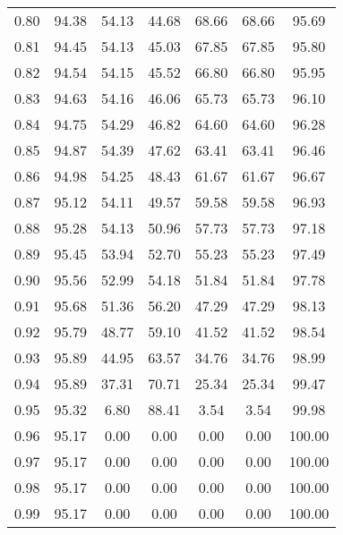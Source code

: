\begin{tabular}{|c|c|c|c|c|c|c|}
      0.80 &     94.38 &     54.13 &      44.68 &   68.66 &      68.66 &         95.69 \\
      0.81 &     94.45 &     54.13 &      45.03 &   67.85 &      67.85 &         95.80 \\
      0.82 &     94.54 &     54.15 &      45.52 &   66.80 &      66.80 &         95.95 \\
      0.83 &     94.63 &     54.16 &      46.06 &   65.73 &      65.73 &         96.10 \\
      0.84 &     94.75 &     54.29 &      46.82 &   64.60 &      64.60 &         96.28 \\
      0.85 &     94.87 &     54.39 &      47.62 &   63.41 &      63.41 &         96.46 \\
      0.86 &     94.98 &     54.25 &      48.43 &   61.67 &      61.67 &         96.67 \\
      0.87 &     95.12 &     54.11 &      49.57 &   59.58 &      59.58 &         96.93 \\
      0.88 &     95.28 &     54.13 &      50.96 &   57.73 &      57.73 &         97.18 \\
      0.89 &     95.45 &     53.94 &      52.70 &   55.23 &      55.23 &         97.49 \\
      0.90 &     95.56 &     52.99 &      54.18 &   51.84 &      51.84 &         97.78 \\
      0.91 &     95.68 &     51.36 &      56.20 &   47.29 &      47.29 &         98.13 \\
      0.92 &     95.79 &     48.77 &      59.10 &   41.52 &      41.52 &         98.54 \\
      0.93 &     95.89 &     44.95 &      63.57 &   34.76 &      34.76 &         98.99 \\
      0.94 &     95.89 &     37.31 &      70.71 &   25.34 &      25.34 &         99.47 \\
      0.95 &     95.32 &      6.80 &      88.41 &    3.54 &       3.54 &         99.98 \\
      0.96 &     95.17 &      0.00 &       0.00 &    0.00 &       0.00 &        100.00 \\
      0.97 &     95.17 &      0.00 &       0.00 &    0.00 &       0.00 &        100.00 \\
      0.98 &     95.17 &      0.00 &       0.00 &    0.00 &       0.00 &        100.00 \\
      0.99 &     95.17 &      0.00 &       0.00 &    0.00 &       0.00 &        100.00 \\
\bottomrule
\end{tabular}
